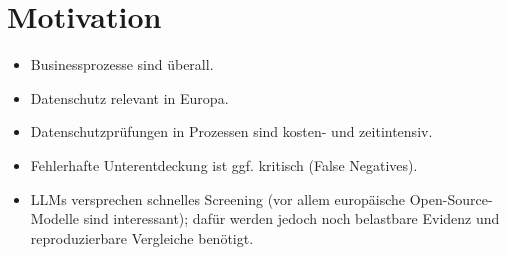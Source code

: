 \section{Motivation}\label{sec:motivation}
\begin{itemize}
    \item Businessprozesse sind überall.
    \item Datenschutz relevant in Europa.
    \item Datenschutzprüfungen in Prozessen sind kosten- und zeitintensiv.
    \item Fehlerhafte Unterentdeckung ist ggf. kritisch (False Negatives).
    \item LLMs versprechen schnelles Screening (vor allem europäische Open-Source-Modelle sind interessant); dafür werden jedoch noch belastbare Evidenz und reproduzierbare Vergleiche benötigt.
\end{itemize}